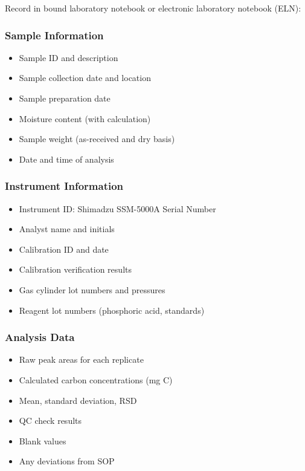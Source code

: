 \documentclass[11pt,a4paper]{article}\usepackage[]{graphicx}\usepackage[]{xcolor}
\begin{document}
Record in bound laboratory notebook or electronic laboratory notebook (ELN):

\subsubsection{Sample Information}
\begin{itemize}[noitemsep]
    \item Sample ID and description
    \item Sample collection date and location
    \item Sample preparation date
    \item Moisture content (with calculation)
    \item Sample weight (as-received and dry basis)
    \item Date and time of analysis
\end{itemize}

\subsubsection{Instrument Information}
\begin{itemize}[noitemsep]
    \item Instrument ID: Shimadzu SSM-5000A Serial Number
    \item Analyst name and initials
    \item Calibration ID and date
    \item Calibration verification results
    \item Gas cylinder lot numbers and pressures
    \item Reagent lot numbers (phosphoric acid, standards)
\end{itemize}

\subsubsection{Analysis Data}
\begin{itemize}[noitemsep]
    \item Raw peak areas for each replicate
    \item Calculated carbon concentrations (mg C)
    \item Mean, standard deviation, RSD
    \item QC check results
    \item Blank values
    \item Any deviations from SOP
\end{itemize}
\end{document}
